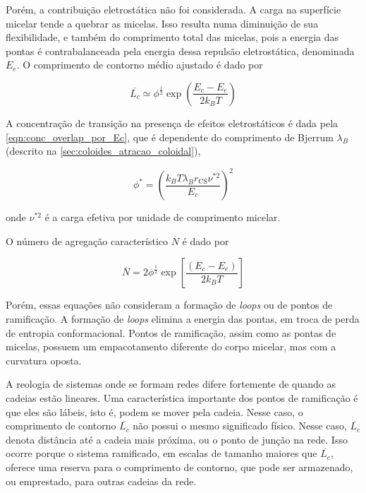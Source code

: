 		Porém, a contribuição eletrostática não foi considerada. A carga na superfície micelar tende a quebrar as micelas. Isso resulta numa diminuição de sua flexibilidade, e também do comprimento total das micelas, pois a energia das pontas é contrabalanceada pela energia dessa repulsão eletrostática, denominada \(E_e\). O comprimento de contorno médio ajustado é dado por \cite{Magid2000b, Mackintosh1990}
		
		\begin{equation}
			\overline{L_c} \simeq \phi^{\frac{1}{2}} \exp \left(\dfrac{E_c - E_e}{2k_BT}\right)
			\label{eqn:l_contorno_carregada}
		\end{equation}

		A concentração de transição na presença de efeitos eletrostáticos é dada pela \autoref{eqn:conc_overlap_por_Ec}\cite{Magid2000b, Mackintosh1990}, que é dependente do comprimento de Bjerrum \(\lambda_B\) (descrito na \autoref{sec:coloides_atracao_coloidal}),
		
 		\begin{equation}
			\phi^* = \left( \frac{k_B T \lambda_B r_{\mathrm{CS}} \nu^{*2}}{E_c} \right) ^ 2
			\label{eqn:conc_overlap_por_Ec}
		\end{equation} 
	
		\noindent onde \(\nu^{*2}\) é a carga efetiva por unidade de comprimento micelar.
		 
		O número de agregação característico \(\overline{N}\) é dado por \cite{Mackintosh1990}
		
		\begin{equation}
			\overline{N} = 2 \phi ^{\frac{1}{2}} \exp \left[ \frac{\left( E_c - E_e \right)}{2 k_B T}  \right]
			\label{eqn:distrib_tamanhos_micelas}
		\end{equation} 
		 
		Porém, essas equações não consideram a formação de \emph{loops} ou de pontos de ramificação. A formação de \emph{loops} elimina a energia das pontas, em troca de perda de entropia conformacional. Pontos de ramificação, assim como as pontas de micelas, possuem um empacotamento diferente do corpo micelar, mas com a curvatura oposta.
		
		A reologia de sistemas onde se formam redes difere fortemente de quando as cadeias estão lineares.\cite{Cates2006, Lequeux1992a} Uma característica importante dos pontos de ramificação é que eles são lábeis, isto é, podem se mover pela cadeia. Nesse caso, o comprimento de contorno \(\overline{L_c}\) não possui o mesmo significado físico. Nesse caso, \(\overline{L_c}\) denota distância até a cadeia mais próxima, ou o ponto de junção na rede. Isso ocorre porque o sistema ramificado, em escalas de tamanho maiores que \(\overline{L_c}\), oferece uma reserva para o comprimento de contorno, que pode ser armazenado, ou emprestado, para outras cadeias da rede. \cite{Cates2006} 
		
